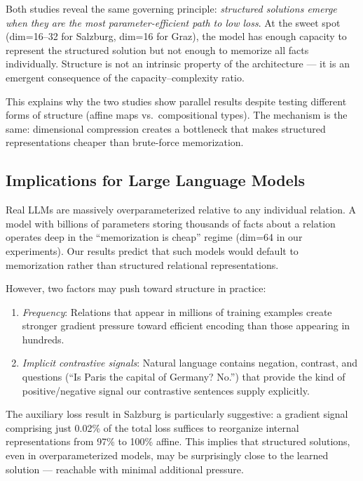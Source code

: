 \documentclass[11pt]{article}
\begin{document}
Both studies reveal the same governing principle: \emph{structured solutions emerge when
they are the most parameter-efficient path to low loss}. At the sweet spot (dim=16--32
for Salzburg, dim=16 for Graz), the model has enough capacity to represent the
structured solution but not enough to memorize all facts individually. Structure is not
an intrinsic property of the architecture --- it is an emergent consequence of the
capacity--complexity ratio.

This explains why the two studies show parallel results despite testing different forms
of structure (affine maps vs.\ compositional types). The mechanism is the same:
dimensional compression creates a bottleneck that makes structured representations
cheaper than brute-force memorization.

\subsection{Implications for Large Language Models}

Real LLMs are massively overparameterized relative to any individual relation. A model
with billions of parameters storing thousands of facts about a relation operates deep
in the ``memorization is cheap'' regime (dim=64 in our experiments). Our results predict
that such models would default to memorization rather than structured relational
representations.

However, two factors may push toward structure in practice:
\begin{enumerate}
\item \emph{Frequency}: Relations that appear in millions of training examples create
  stronger gradient pressure toward efficient encoding than those appearing in hundreds.
\item \emph{Implicit contrastive signals}: Natural language contains negation, contrast,
  and questions (``Is Paris the capital of Germany? No.'') that provide the kind of
  positive/negative signal our contrastive sentences supply explicitly.
\end{enumerate}

The auxiliary loss result in Salzburg is particularly suggestive: a gradient signal
comprising just 0.02\% of the total loss suffices to reorganize internal representations
from 97\% to 100\% affine. This implies that structured solutions, even in
overparameterized models, may be surprisingly close to the learned solution --- reachable
with minimal additional pressure.
\end{document}
